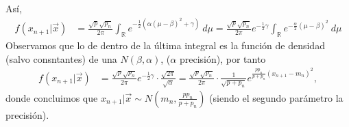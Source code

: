 Así,
\begin{align*}
    f(x_{n+1} | \vec{x}) &= \frac{\sqrt{p}\sqrt{p_n}}{2\pi} \int_{\mathbb{R}} e^{-\frac{1}{2}(\alpha(\mu- \beta)^2 + \gamma)} \ d\mu =  \frac{\sqrt{p}\sqrt{p_n}}{2\pi}e^{-\frac{1}{2}\gamma} \int_{\mathbb{R}} e^{-\frac{\alpha}{2}(\mu- \beta)^2 } \ d\mu
\end{align*}
Observamos que lo de dentro de la última integral es la función de densidad (salvo consntantes) de una $N(\beta,\alpha)$, ($\alpha$ precisión), por tanto
\begin{align*}
     f(x_{n+1} | \vec{x}) &= \frac{\sqrt{p}\sqrt{p_n}}{2\pi}e^{-\frac{1}{2}\gamma} \cdot \frac{\sqrt{2\pi}}{\sqrt{\alpha}} = \frac{\sqrt{p}\sqrt{p_n}}{2\pi} \cdot \frac{1}{\sqrt{p+p_n}}e^{\frac{pp_n}{p+p_n}(x_{n+1} - m_n)^2},
\end{align*}
donde concluimos que $x_{n+1} | \vec{x} \sim N\left( m_n, \frac{pp_n}{p + p_n} \right)$ (siendo el segundo parámetro la precisión).


